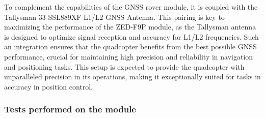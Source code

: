 \documentclass{article}
\begin{document}
To complement the capabilities of the GNSS rover module, it is coupled with the Tallysman 33-SSL889XF L1/L2 GNSS Antenna. This pairing is key to maximizing the performance of the ZED-F9P module, as the Tallysman antenna is designed to optimize signal reception 
and accuracy for L1/L2 frequencies. Such an integration ensures that the quadcopter benefits from the best possible GNSS performance, crucial for maintaining high precision and reliability in navigation and positioning tasks. This setup is expected to provide 
the quadcopter with unparalleled precision in its operations, making it exceptionally suited for tasks in accuracy in position control.
\subsubsection*{Tests performed on the module}
\end{document}
